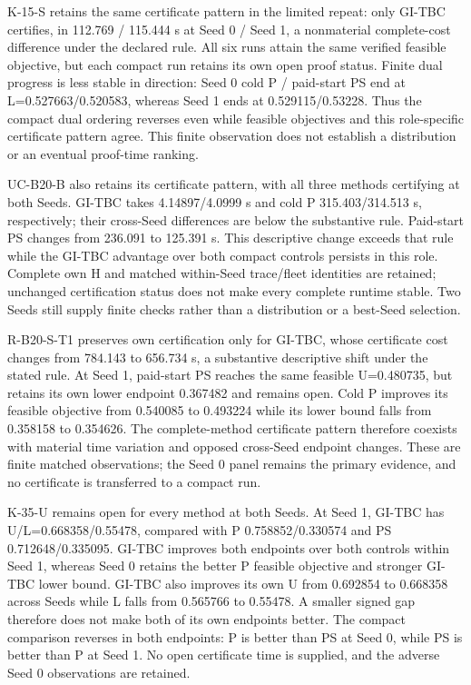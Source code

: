 \documentclass[
  american,
  11pt,
]{article}
\begin{document}
K-15-S retains the same certificate pattern in the limited repeat: only
GI-TBC certifies, in 112.769 / 115.444 s at Seed 0 / Seed 1, a
nonmaterial complete-cost difference under the declared rule. All six
runs attain the same verified feasible objective, but each compact run
retains its own open proof status. Finite dual progress is less stable
in direction: Seed 0 cold P / paid-start PS end at L=0.527663/0.520583,
whereas Seed 1 ends at 0.529115/0.53228. Thus the compact dual ordering
reverses even while feasible objectives and this role-specific
certificate pattern agree. This finite observation does not establish a
distribution or an eventual proof-time ranking.

UC-B20-B also retains its certificate pattern, with all three methods
certifying at both Seeds. GI-TBC takes 4.14897/4.0999 s and cold P
315.403/314.513 s, respectively; their cross-Seed differences are below
the substantive rule. Paid-start PS changes from 236.091 to 125.391 s.
This descriptive change exceeds that rule while the GI-TBC advantage
over both compact controls persists in this role. Complete own H and
matched within-Seed trace/fleet identities are retained; unchanged
certification status does not make every complete runtime stable. Two
Seeds still supply finite checks rather than a distribution or a
best-Seed selection.

R-B20-S-T1 preserves own certification only for GI-TBC, whose
certificate cost changes from 784.143 to 656.734 s, a substantive
descriptive shift under the stated rule. At Seed 1, paid-start PS
reaches the same feasible U=0.480735, but retains its own lower endpoint
0.367482 and remains open. Cold P improves its feasible objective from
0.540085 to 0.493224 while its lower bound falls from 0.358158 to
0.354626. The complete-method certificate pattern therefore coexists
with material time variation and opposed cross-Seed endpoint changes.
These are finite matched observations; the Seed 0 panel remains the
primary evidence, and no certificate is transferred to a compact run.

K-35-U remains open for every method at both Seeds. At Seed 1, GI-TBC
has U/L=0.668358/0.55478, compared with P 0.758852/0.330574 and PS
0.712648/0.335095. GI-TBC improves both endpoints over both controls
within Seed 1, whereas Seed 0 retains the better P feasible objective
and stronger GI-TBC lower bound. GI-TBC also improves its own U from
0.692854 to 0.668358 across Seeds while L falls from 0.565766 to
0.55478. A smaller signed gap therefore does not make both of its own
endpoints better. The compact comparison reverses in both endpoints: P
is better than PS at Seed 0, while PS is better than P at Seed 1. No
open certificate time is supplied, and the adverse Seed 0 observations
are retained.
\end{document}

